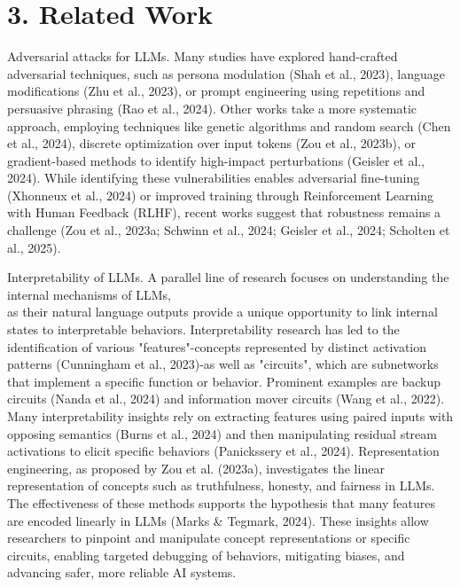 \documentclass[10pt]{article}
\begin{document}
\section*{3. Related Work}
Adversarial attacks for LLMs. Many studies have explored hand-crafted adversarial techniques, such as persona modulation (Shah et al., 2023), language modifications (Zhu et al., 2023), or prompt engineering using repetitions and persuasive phrasing (Rao et al., 2024). Other works take a more systematic approach, employing techniques like genetic algorithms and random search (Chen et al., 2024), discrete optimization over input tokens (Zou et al., 2023b), or gradient-based methods to identify high-impact perturbations (Geisler et al., 2024). While identifying these vulnerabilities enables adversarial fine-tuning (Xhonneux et al., 2024) or improved training through Reinforcement Learning with Human Feedback (RLHF), recent works suggest that robustness remains a challenge (Zou et al., 2023a; Schwinn et al., 2024; Geisler et al., 2024; Scholten et al., 2025).

Interpretability of LLMs. A parallel line of research focuses on understanding the internal mechanisms of LLMs,\\
as their natural language outputs provide a unique opportunity to link internal states to interpretable behaviors. Interpretability research has led to the identification of various "features"-concepts represented by distinct activation patterns (Cunningham et al., 2023)-as well as "circuits", which are subnetworks that implement a specific function or behavior. Prominent examples are backup circuits (Nanda et al., 2024) and information mover circuits (Wang et al., 2022). Many interpretability insights rely on extracting features using paired inputs with opposing semantics (Burns et al., 2024) and then manipulating residual stream activations to elicit specific behaviors (Panickssery et al., 2024). Representation engineering, as proposed by Zou et al. (2023a), investigates the linear representation of concepts such as truthfulness, honesty, and fairness in LLMs. The effectiveness of these methods supports the hypothesis that many features are encoded linearly in LLMs (Marks \& Tegmark, 2024). These insights allow researchers to pinpoint and manipulate concept representations or specific circuits, enabling targeted debugging of behaviors, mitigating biases, and advancing safer, more reliable AI systems.
\end{document}

